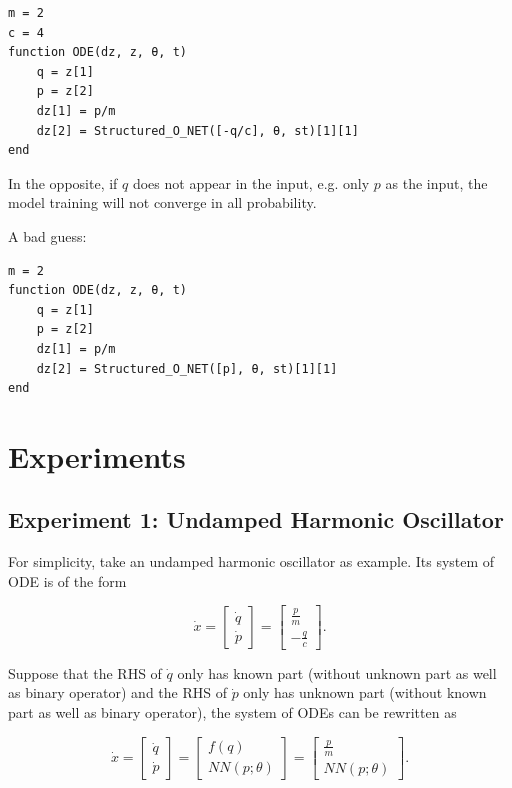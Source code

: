 \documentclass[
	parskip, 			   %
	twoside, 			   %
	DIV=14, 			   %
	BCOR=15.0mm, 		   %
	headsepline, 		   %
	open=right, 		   %
	captions=tableheading, %
	bibliography=totoc,    %
	numbers=noenddot       %
]{scrreprt}
\begin{document}
\begin{verbatim}
m = 2
c = 4
function ODE(dz, z, θ, t)
    q = z[1]
    p = z[2]
    dz[1] = p/m
    dz[2] = Structured_O_NET([-q/c], θ, st)[1][1]
end
\end{verbatim}

In the opposite, if $q$ does not appear in the input, e.g. only $p$ as the input, the model training will not converge in all probability.

A bad guess:

\begin{verbatim}
m = 2
function ODE(dz, z, θ, t)
    q = z[1]
    p = z[2]
    dz[1] = p/m
    dz[2] = Structured_O_NET([p], θ, st)[1][1]
end
\end{verbatim}

\section{Experiments}

\subsection{Experiment 1: Undamped Harmonic Oscillator}
For simplicity, take an undamped harmonic oscillator as example. Its system of ODE is of the form

\begin{equation}
    \label{eq:ODE_udho}
    \dot{x} =
    \begin{bmatrix}
    \dot{q}\\
    \dot{p}
    \end{bmatrix}
    =
    \begin{bmatrix}
    \frac{p}{m}\\
    -\frac{q}{c}
    \end{bmatrix}.
\end{equation}

Suppose that the RHS of $\dot{q}$ only has known part (without unknown part as well as binary operator) and the RHS of $\dot{p}$ only has unknown part (without known part as well as binary operator), the system of ODEs can be rewritten as

\begin{equation}
    \label{eq:structured_ODE_udho}
    \dot{x} =
    \begin{bmatrix}
    \dot{q}\\
    \dot{p}
    \end{bmatrix}
    =
    \begin{bmatrix}
    {f(q)}\\
    {NN(p;\theta)}
    \end{bmatrix}
    =
    \begin{bmatrix}
    \frac{p}{m}\\
    NN(p;\theta)
    \end{bmatrix}.
\end{equation}
\end{document}
